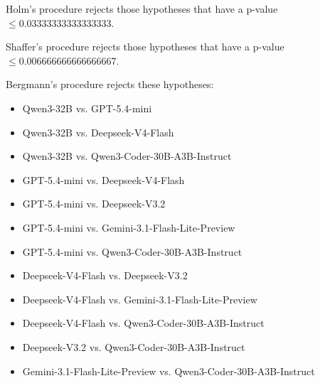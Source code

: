 \documentclass[a4paper,10pt]{article}
\begin{document}
\begin{landscape}
Holm's procedure rejects those hypotheses that have a p-value $\le0.03333333333333333$.


Shaffer's procedure rejects those hypotheses that have a p-value $\le0.006666666666666667$.


Bergmann's procedure rejects these hypotheses:


\begin{itemize}


\item Qwen3-32B vs. GPT-5.4-mini
\item Qwen3-32B vs. Deepseek-V4-Flash
\item Qwen3-32B vs. Qwen3-Coder-30B-A3B-Instruct
\item GPT-5.4-mini vs. Deepseek-V4-Flash
\item GPT-5.4-mini vs. Deepseek-V3.2
\item GPT-5.4-mini vs. Gemini-3.1-Flash-Lite-Preview
\item GPT-5.4-mini vs. Qwen3-Coder-30B-A3B-Instruct
\item Deepseek-V4-Flash vs. Deepseek-V3.2
\item Deepseek-V4-Flash vs. Gemini-3.1-Flash-Lite-Preview
\item Deepseek-V4-Flash vs. Qwen3-Coder-30B-A3B-Instruct
\item Deepseek-V3.2 vs. Qwen3-Coder-30B-A3B-Instruct
\item Gemini-3.1-Flash-Lite-Preview vs. Qwen3-Coder-30B-A3B-Instruct
\end{itemize}



\end{landscape}
\end{document}
